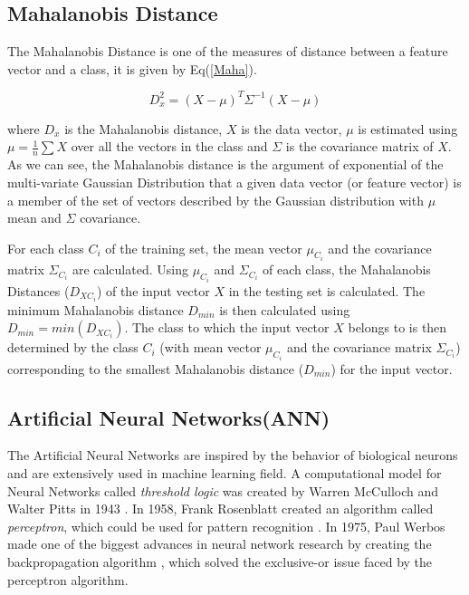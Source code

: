 	\subsection{Mahalanobis Distance}
    \label{Chap2:Maha}
		The Mahalanobis Distance is one of the measures of distance between a feature vector and a class, it is given by Eq(\ref{Maha}).
        
		\begin{equation}
			D^2_x = (X - \mu)^T  \Sigma ^{-1}  (X - \mu)
			\label{Maha}
		\end{equation}
        
		where $D_x$ is the Mahalanobis distance, $X$ is the data vector, $\mu$ is estimated using $\mu = \frac{1}{n}\sum X$ over all the vectors in the class and $\Sigma$ is the covariance matrix of $X$. As we can see, the Mahalanobis distance is the argument of exponential of the multi-variate Gaussian Distribution that a given data vector (or feature vector) is a member of the set of vectors described by the Gaussian distribution with $\mu$ mean and $\Sigma$ covariance. \newline

		For each class $C_i$ of the training set, the mean vector $\mu_{C_i}$ and the covariance matrix $\Sigma_{C_i}$ are calculated. Using $\mu_{C_i}$ and $\Sigma_{C_i}$ of each class, the Mahalanobis Distances ($D_{XC_i}$) of the input vector $X$ in the testing set is calculated. The minimum Mahalanobis distance $D_{min}$ is then calculated using $D_{min} = min(D_{XC_i})$. The class to which the input vector $X$ belongs to is then determined by the class $C_i$ (with mean vector $\mu_{C_i}$ and the covariance matrix $\Sigma_{C_i}$) corresponding to the smallest Mahalanobis distance ($D_{min}$) for the input vector.
		
	\subsection{Artificial Neural Networks(ANN)}
    \label{Chap2:ANN}
		The Artificial Neural Networks are inspired by the behavior of biological neurons and are extensively used in machine learning field. A computational model for Neural Networks called \textit{threshold logic} was created by Warren McCulloch and Walter Pitts in 1943 \cite{McCulloch1943}. In 1958, Frank Rosenblatt created an algorithm called \textit{perceptron}, which could be used for pattern recognition \cite{Rosenblatt1958thePerceptron}. In 1975, Paul Werbos made one of the biggest advances in neural network research by creating the backpropagation algorithm \cite{werbos1974beyond}, which solved the exclusive-or issue faced by the perceptron algorithm. 
        

